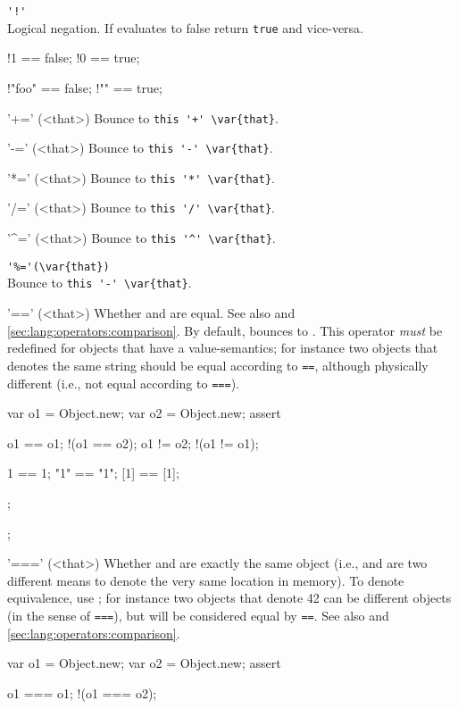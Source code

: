 \begin{urbiscriptapi}
\item \lstinline|'!'|\\
  Logical negation.  If \this evaluates to false return \lstinline|true| and
  vice-versa.
\begin{urbiassert}
!1 == false;
!0 == true;

!"foo" == false;
!""    == true;
\end{urbiassert}

\item['+='](<that>)%
  Bounce to \lstinline|this '+' \var{that}|.

\item['-='](<that>)%
  Bounce to \lstinline|this '-' \var{that}|.

\item['*='](<that>)%
  Bounce to \lstinline|this '*' \var{that}|.

\item['/='](<that>)%
  Bounce to \lstinline|this '/' \var{that}|.

\item['^='](<that>)%
  Bounce to \lstinline|this '^' \var{that}|.

\item \lstinline|'%='(\var{that})|\\
  Bounce to \lstinline|this '-' \var{that}|.

\item['=='](<that>)%
  Whether \this and \that are equal.  See also  and
  \autoref{sec:lang:operators:comparison}.  By default, bounces to
  .  This operator \emph{must} be redefined for objects that
  have a value-semantics; for instance two  objects that
  denotes the same string should be equal according to \lstinline|==|,
  although physically different (i.e., not equal according to
  \lstinline|===|).
\begin{urbiscript}
{
  var o1 = Object.new;
  var o2 = Object.new;
  assert
  {
      o1 == o1;
    !(o1 == o2);
      o1 != o2;
    !(o1 != o1);

      1  ==  1;
     "1" == "1";
     [1] == [1];
  };
};
\end{urbiscript}

\item['==='](<that>)%
  Whether \this and \that are exactly the same object (i.e., \this and \that
  are two different means to denote the very same location in memory).  To
  denote equivalence, use ; for instance two 
  objects that denote 42 can be different objects (in the sense of
  \lstinline|===|), but will be considered equal by \lstinline|==|.  See
  also  and \autoref{sec:lang:operators:comparison}.
\begin{urbiscript}
{
  var o1 = Object.new;
  var o2 = Object.new;
  assert
  {
      o1 === o1;
    !(o1 === o2);

}}
\end{urbiscript}
\end{urbiscriptapi}
